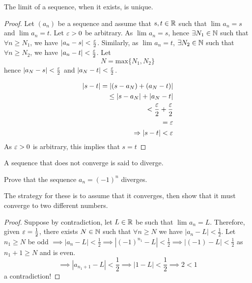 
\begin{theorem}
	The limit of a sequence, when it exists, is unique.
\end{theorem}

\begin{proof}
	Let $\left( a_n \right) $ be a sequence and assume that  $s, t \in \mathbb{R}$ such that $\lim_{} a_n = s$ and $\lim_{} a_n = t$. Let $\e > 0$ be arbitrary. As $\lim_{} a_n = s$, hence $\exists N_1 \in \mathbb{N}$ such that $\forall n \ge N_1$, we have $\left|a_n - s\right| < \frac{\e}{2}$. Similarly, as $\lim_{} a_n = t$, $\exists N_2 \in \mathbb{N} $ such that $\forall n \ge N_2$, we have $\left|a_n - t\right| < \frac{\e}{2}$. Let
	\begin{equation}
		N = \text{max}\{N_1, N_2\}
	\end{equation}
	hence $\left|a_N - s\right| < \frac{\e}{2}$ and $\left|a_N - t\right| < \frac{\e}{2}$.

	\begin{align}
		\left|s - t\right| = \left|\left( s - a_N \right) + \left( a_N - t \right) \right| \\
		\le \left|s - a_N\right| + \left|a_N - t\right|\\
		< \frac{\e}{2} + \frac{\e}{2} \\
		= \e \\
		\implies \left|s - t\right| < \e
	\end{align}
	As  $\e > 0$ is arbitrary, this implies that $s=t$
\end{proof}

\begin{definition}
	A sequence that does not converge is said to diverge.
\end{definition}

\begin{eg}
	Prove that the sequence $a_n = \left( -1 \right)^{n}$ diverges.
\end{eg}

\begin{note}
	The strategy for these is to assume that it converges, then show that it must converge to two different numbers.
\end{note}

\begin{proof}
	Suppose by contradiction, let $L \in \mathbb{R}$ be such that $\lim_{} a_n = L$. Therefore, given $\e = \frac{1}{2}$, there exists $N \in \mathbb{N}$ such that $\forall n \ge N$ we have $\left|a_n - L\right| < \frac{1}{2}$. Let $n_1 \ge N$ be odd $\implies \left|a_n - L\right| < \frac{1}{2} \implies \left|\left( -1 \right) ^{n_1} - L\right| < \frac{1}{2} \implies \left|\left( -1 \right) - L\right| < \frac{1}{2}$ as $n_1 + 1 \ge N$ and is even.
	\begin{equation}
		\implies \left|a_{n_1 + 1} - L\right| < \frac{1}{2} \implies \left|1 - L\right| < \frac{1}{2} \implies 2 < 1 
	\end{equation}
	a contradiction!
\end{proof}

